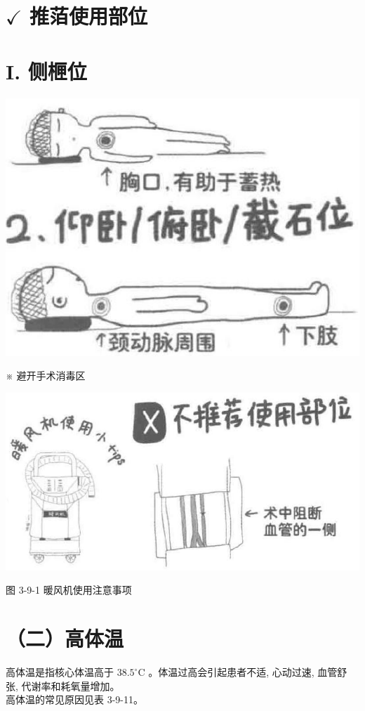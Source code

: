 \documentclass[10pt]{article}
\begin{document}
\section*{$\checkmark$ 推萡使用部位}
\section*{I. 侧㭱位}
\begin{center}
\includegraphics[max width=\textwidth]{2024_07_05_645bb794a4d4f32ee0c8g-160}
\end{center}

※ 避开手术消毒区

\begin{center}
\includegraphics[max width=\textwidth]{2024_07_05_645bb794a4d4f32ee0c8g-160(1)}
\end{center}

图 3-9-1 暖风机使用注意事项

\section*{（二）高体温}
高体温是指核心体温高于 $38.5^{\circ} \mathrm{C}$ 。体温过高会引起患者不适, 心动过速, 血管舒张, 代谢率和耗氧量增加。\\
高体温的常见原因见表 3-9-11。
\end{document}
